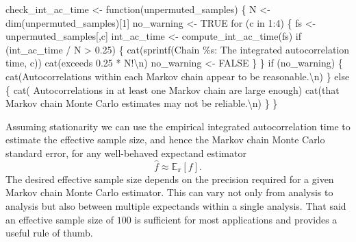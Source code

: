 \documentclass[
  letterpaper,
  DIV=11,
  numbers=noendperiod]{scrartcl}
\newenvironment{Shaded}{\begin{snugshade}}{\end{snugshade}}
\newcommand{\ConstantTok}[1]{\textcolor[rgb]{0.56,0.35,0.01}{#1}}
\newcommand{\ControlFlowTok}[1]{\textcolor[rgb]{0.00,0.23,0.31}{#1}}
\newcommand{\DecValTok}[1]{\textcolor[rgb]{0.68,0.00,0.00}{#1}}
\newcommand{\FloatTok}[1]{\textcolor[rgb]{0.68,0.00,0.00}{#1}}
\newcommand{\FunctionTok}[1]{\textcolor[rgb]{0.28,0.35,0.67}{#1}}
\newcommand{\NormalTok}[1]{\textcolor[rgb]{0.00,0.23,0.31}{#1}}
\newcommand{\OtherTok}[1]{\textcolor[rgb]{0.00,0.23,0.31}{#1}}
\newcommand{\SpecialCharTok}[1]{\textcolor[rgb]{0.37,0.37,0.37}{#1}}
\newcommand{\StringTok}[1]{\textcolor[rgb]{0.13,0.47,0.30}{#1}}
\begin{document}
\begin{Shaded}
\begin{Highlighting}[]
\NormalTok{check\_int\_ac\_time }\OtherTok{\textless{}{-}} \ControlFlowTok{function}\NormalTok{(unpermuted\_samples) \{}
\NormalTok{  N }\OtherTok{\textless{}{-}} \FunctionTok{dim}\NormalTok{(unpermuted\_samples)[}\DecValTok{1}\NormalTok{]}
\NormalTok{  no\_warning }\OtherTok{\textless{}{-}} \ConstantTok{TRUE}
  \ControlFlowTok{for}\NormalTok{ (c }\ControlFlowTok{in} \DecValTok{1}\SpecialCharTok{:}\DecValTok{4}\NormalTok{) \{}
\NormalTok{    fs }\OtherTok{\textless{}{-}}\NormalTok{ unpermuted\_samples[,c]}
\NormalTok{    int\_ac\_time }\OtherTok{\textless{}{-}} \FunctionTok{compute\_int\_ac\_time}\NormalTok{(fs)}
    \ControlFlowTok{if}\NormalTok{ (int\_ac\_time }\SpecialCharTok{/}\NormalTok{ N }\SpecialCharTok{\textgreater{}} \FloatTok{0.25}\NormalTok{) \{}
      \FunctionTok{cat}\NormalTok{(}\FunctionTok{sprintf}\NormalTok{(}\StringTok{\textquotesingle{}Chain \%s: The integrated autocorrelation time\textquotesingle{}}\NormalTok{, c))}
      \FunctionTok{cat}\NormalTok{(}\StringTok{\textquotesingle{}exceeds 0.25 * N!}\SpecialCharTok{\textbackslash{}n}\StringTok{\textquotesingle{}}\NormalTok{)}
\NormalTok{      no\_warning }\OtherTok{\textless{}{-}} \ConstantTok{FALSE}
\NormalTok{    \}}
\NormalTok{  \}}
  \ControlFlowTok{if}\NormalTok{ (no\_warning) \{}
    \FunctionTok{cat}\NormalTok{(}\StringTok{\textquotesingle{}Autocorrelations within each Markov chain appear to be reasonable.}\SpecialCharTok{\textbackslash{}n}\StringTok{\textquotesingle{}}\NormalTok{)}
\NormalTok{  \} }\ControlFlowTok{else}\NormalTok{ \{}
    \FunctionTok{cat}\NormalTok{(}\StringTok{\textquotesingle{}  Autocorrelations in at least one Markov chain are large enough\textquotesingle{}}\NormalTok{)}
    \FunctionTok{cat}\NormalTok{(}\StringTok{\textquotesingle{}that Markov chain Monte Carlo estimates may not be reliable.}\SpecialCharTok{\textbackslash{}n}\StringTok{\textquotesingle{}}\NormalTok{)}
\NormalTok{  \}}
\NormalTok{\}}
\end{Highlighting}
\end{Shaded}

Assuming stationarity we can use the empirical integrated
autocorrelation time to estimate the effective sample size, and hence
the Markov chain Monte Carlo standard error, for any well-behaved
expectand estimator \[
\hat{f} \approx \mathbb{E}_{\pi}[f].
\] The desired effective sample size depends on the precision required
for a given Markov chain Monte Carlo estimator. This can vary not only
from analysis to analysis but also between multiple expectands within a
single analysis. That said an effective sample size of \(100\) is
sufficient for most applications and provides a useful rule of thumb.
\end{document}
